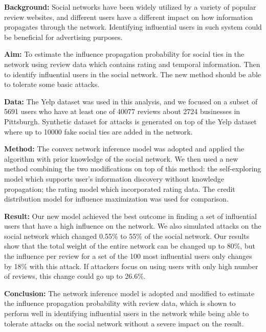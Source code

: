 \textbf{Background:} Social networks have been widely utilized by a variety of popular review
websites, and different users have a different impact on how information propagates
through the network. Identifying influential users in such system could be beneficial
for advertising purposes.
\par
\textbf{Aim:} To estimate the influence propagation probability for social ties in the network
using review data which contains rating and temporal information. Then to identify
influential users in the social network. The new method should be able to tolerate
some basic attacks.
\par
\textbf{Data:} The Yelp dataset was used in this analysis, and we focused on a subset of 5691
users who have at least one of 40077 reviews about 2724 businesses in Pittsburgh.
Synthetic dataset for attacks is generated on top of the Yelp dataset where up to 10000
fake social ties are added in the network.
\par
\textbf{Method:} The convex network inference model was adopted and applied the algorithm
with prior knowledge of the social network. We then used a new method combining
the two modifications on top of this method: the self-exploring model which supports
user’s information discovery without knowledge propagation; the rating model which
incorporated rating data. The credit distribution model for influence maximization
was used for comparison.
\par
\textbf{Result:} Our new model achieved the best outcome in finding a set of influential users
that have a high influence on the network. We also simulated attacks on the social
network which changed 0.55\% to 55\% of the social network. Our results show that the
total weight of the entire network can be changed up to 80\%, but the influence per
review for a set of the 100 most influential users only changes by 18\% with this attack.
If attackers focus on using users with only high number of reviews, this change could
go up to 26.6\%.
\par
\textbf{Conclusion:} The network inference model is adopted and modified to estimate the
influence propagation probability with review data, which is shown to perform well in
identifying influential users in the network while being able to tolerate attacks on the
social network without a severe impact on the result.